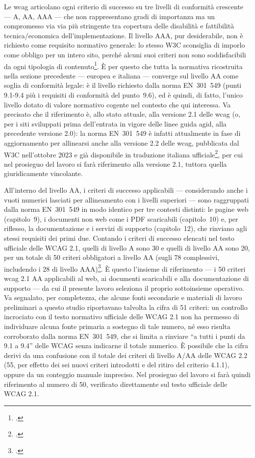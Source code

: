 Le \gls{wcag} articolano ogni criterio di successo su tre livelli di conformità crescente --- A, AA, AAA --- che non rappresentano gradi di importanza ma un compromesso via via più stringente tra copertura delle disabilità e fattibilità tecnica/economica dell'implementazione. Il livello AAA, pur desiderabile, non è richiesto come requisito normativo generale: lo stesso W3C sconsiglia di imporlo come obbligo per un intero sito, perché alcuni suoi criteri non sono soddisfacibili da ogni tipologia di contenuto\footcite[§~9.0, nota~4]{norma:en301549}. È per questo che tutta la normativa ricostruita nella sezione precedente --- europea e italiana --- converge sul livello AA come soglia di conformità legale: è il livello richiesto dalla norma EN~301~549 (punti 9.1-9.4 più i requisiti di conformità del punto~9.6), ed è quindi, di fatto, l'unico livello dotato di valore normativo cogente nel contesto che qui interessa. Va precisato che il riferimento è, allo stato attuale, alla versione 2.1 delle \gls{wcag} (o, per i siti sviluppati prima dell'entrata in vigore delle linee guida \gls{agid}, alla precedente versione 2.0): la norma EN~301~549 è infatti attualmente in fase di aggiornamento per allinearsi anche alla versione 2.2 delle \gls{wcag}, pubblicata dal W3C nell'ottobre 2023 e già disponibile in traduzione italiana ufficiale\footcite[§~8.5 e §~2 (Riferimenti norme tecniche)]{agid:lg-82-2022}, per cui nel prosieguo del lavoro si farà riferimento alla versione 2.1, tuttora quella giuridicamente vincolante.

All'interno del livello AA, i criteri di successo applicabili --- considerando anche i vuoti numerici lasciati per allineamento con i livelli superiori --- sono raggruppati dalla norma EN~301~549 in modo identico per tre contesti distinti: le pagine web (capitolo~9), i documenti non web come i PDF scaricabili (capitolo~10) e, per riflesso, la documentazione e i servizi di supporto (capitolo~12), che rinviano agli stessi requisiti dei primi due. Contando i criteri di successo elencati nel testo ufficiale delle WCAG 2.1, quelli di livello A sono 30 e quelli di livello AA sono 20, per un totale di 50 criteri obbligatori a livello AA (sugli 78 complessivi, includendo i 28 di livello AAA)\footcite{w3c:quickref}. È questo l'insieme di riferimento --- i 50 criteri \gls{wcag} 2.1 AA applicabili al web, ai documenti scaricabili e alla documentazione di supporto --- da cui il presente lavoro seleziona il proprio sottoinsieme operativo. Va segnalato, per completezza, che alcune fonti secondarie e materiali di lavoro preliminari a questo studio riportavano talvolta la cifra di 51 criteri: un controllo incrociato con il testo normativo ufficiale delle WCAG 2.1 non ha permesso di individuare alcuna fonte primaria a sostegno di tale numero, né esso risulta corroborato dalla norma EN~301~549, che si limita a rinviare \enquote{a tutti i punti da 9.1 a 9.4} delle WCAG senza indicarne il totale numerico. È possibile che la cifra derivi da una confusione con il totale dei criteri di livello A/AA delle WCAG 2.2 (55, per effetto dei sei nuovi criteri introdotti e del ritiro del criterio 4.1.1), oppure da un conteggio manuale impreciso. Nel prosieguo del lavoro si farà quindi riferimento al numero di 50, verificato direttamente sul testo ufficiale delle WCAG 2.1.

